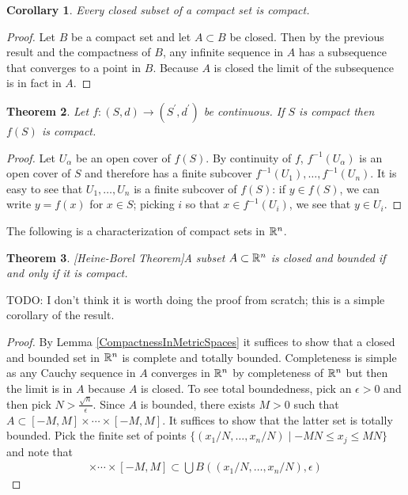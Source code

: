 \documentclass{amsart}
\newtheorem{thm}{Theorem}[section]
\newtheorem{cor}[thm]{Corollary}
\theoremstyle{remark}
\theoremstyle{definition}
\begin{document}
\begin{cor}\label{ClosedSubsetsCompact}Every closed subset of a compact set is compact.
\end{cor} 
\begin{proof}Let $B$ be a compact set and let $A \subset B$ be
  closed.  Then by the previous result and the compactness of $B$, any
  infinite sequence in $A$ has a subsequence that converges to a point
  in $B$.
  Because $A$ is closed the limit of the subsequence is in fact in $A$.
\end{proof}

\begin{thm}\label{ContinuousImageOfCompact}Let $f : (S, d) \to
  (S^\prime, d^\prime)$ be continuous.  If $S$ is compact then $f(S)$
  is compact.
\end{thm}
\begin{proof}Let $U_\alpha$ be an open cover of $f(S)$.  By continuity
  of $f$, $f^{-1}(U_\alpha)$ is an open cover of $S$ and therefore has
  a finite subcover $f^{-1}(U_1), \dots, f^{-1}(U_n)$.  It is easy to
  see that $U_1, \dots, U_n$ is a finite subcover of $f(S)$:  if $y \in
  f(S)$, we can write $y = f(x)$ for $x \in S$; picking $i$ so that $x \in
  f^{-1}(U_i)$, we see that $y \in U_i$.
\end{proof}

The following is a characterization of compact sets in $\mathbb{R}^n$.
\begin{thm}\label{HeineBorel}[Heine-Borel Theorem]A subset $A \subset
  \mathbb{R}^n$ is closed and
  bounded if and only if it is compact.
\end{thm}
TODO:  I don't think it is worth doing the proof from scratch; this is
a simple corollary of the result.
\begin{proof}By Lemma \ref{CompactnessInMetricSpaces} it suffices to
  show that a closed and bounded set in $\mathbb{R}^n$ is complete and
  totally bounded.  Completeness is simple as any Cauchy sequence in
  $A$ converges in $\mathbb{R}^n$ by completeness of $\mathbb{R}^n$ but then
  the limit is in $A$ because $A$ is closed.  To see total
  boundedness, pick an $\epsilon > 0$ and then pick $N >
  \frac{\sqrt{n}}{\epsilon}$.  Since $A$ is bounded, there exists $M >
  0$ such that $A \subset [-M, M] \times \cdots \times [-M,M]$.  It
  suffices to show that the latter set is totally bounded.  Pick
  the finite set of points $\lbrace (x_1/N, \dots , x_n/N) \mid -MN \leq x_j
    \leq MN \rbrace$ and note that 
\begin{align*} [-M, M] \times \cdots \times
  [-M,M] \subset \bigcup B((x_1/N, \dots , x_n/N), \epsilon)
\end{align*}
\end{proof}
\end{document}
